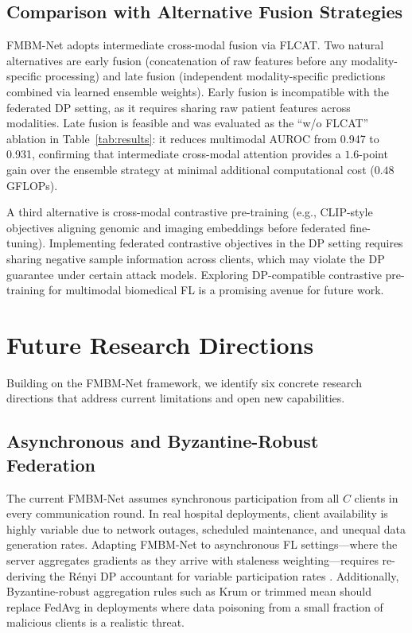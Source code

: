 \documentclass[a4paper,fleqn]{cas-dc}
\begin{document}
\subsection{Comparison with Alternative Fusion Strategies}

FMBM-Net adopts intermediate cross-modal fusion via FLCAT. Two natural
alternatives are early fusion (concatenation of raw features before any
modality-specific processing) and late fusion (independent modality-specific
predictions combined via learned ensemble weights). Early fusion is
incompatible with the federated DP setting, as it requires sharing raw
patient features across modalities. Late fusion is feasible and was evaluated
as the ``w/o FLCAT'' ablation in Table~\ref{tab:results}: it reduces
multimodal AUROC from 0.947 to 0.931, confirming that intermediate
cross-modal attention provides a $1.6$-point gain over the ensemble strategy
at minimal additional computational cost ($0.48$ GFLOPs).

A third alternative is cross-modal contrastive pre-training (e.g., CLIP-style
objectives aligning genomic and imaging embeddings before federated fine-tuning).
Implementing federated contrastive objectives in the DP setting requires
sharing negative sample information across clients, which may violate the DP
guarantee under certain attack models. Exploring DP-compatible contrastive
pre-training for multimodal biomedical FL is a promising avenue for future work.

\section{Future Research Directions}
\label{sec:future}

Building on the FMBM-Net framework, we identify six concrete research directions
that address current limitations and open new capabilities.

\subsection{Asynchronous and Byzantine-Robust Federation}

The current FMBM-Net assumes synchronous participation from all $C$ clients
in every communication round. In real hospital deployments, client availability
is highly variable due to network outages, scheduled maintenance, and unequal
data generation rates. Adapting FMBM-Net to asynchronous FL settings---where
the server aggregates gradients as they arrive with staleness weighting---requires
re-deriving the R\'{e}nyi DP accountant for variable participation rates
\citep{mironov2017renyi}. Additionally, Byzantine-robust aggregation rules
such as Krum or trimmed mean should replace FedAvg in deployments where
data poisoning from a small fraction of malicious clients is a realistic threat.
\end{document}
